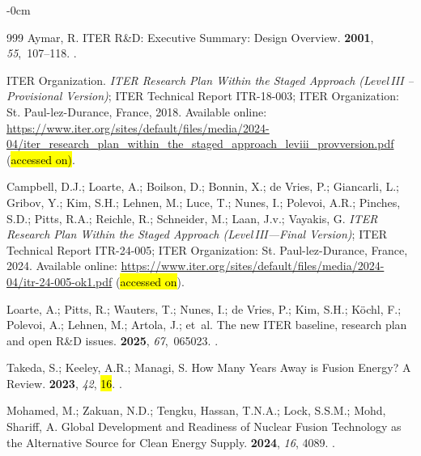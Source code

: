 \documentclass[particles,article,accept,pdftex,moreauthors]{Definitions/mdpi}
\begin{document}
\begin{adjustwidth}{-\extralength}{0cm}
\begin{thebibliography}{999}
Aymar, R.
\newblock ITER R\&D: Executive Summary: Design Overview.
 {\bf 2001}, {\em 55},~107--118.
.

{ITER Organization}.
\newblock \emph{ITER Research Plan Within the Staged Approach (Level\,III –
  Provisional Version)};
\newblock ITER Technical Report ITR-18-003; ITER Organization: St. Paul-lez-Durance, France,  2018.
\newblock
  Available online:  \url{https://www.iter.org/sites/default/files/media/2024-04/iter_research_plan_within_the_staged_approach_leviii_provversion.pdf} (\hl{accessed on)}.

Campbell, D.J.; Loarte, A.;  Boilson, D.; Bonnin, X.; de Vries, P.; Giancarli, L.; Gribov, Y.; Kim, S.H.; Lehnen, M.; Luce, T.; Nunes, I.; Polevoi, A.R.; Pinches, S.D.; Pitts, R.A.; Reichle, R.; Schneider, M.; Laan, J.v.; Vayakis, G.
\newblock \emph{ITER Research Plan Within the Staged Approach (Level\,III---Final
  Version)};
\newblock ITER Technical Report ITR-24-005; {ITER Organization}: St. Paul-lez-Durance, France,  2024.
\newblock
Available online:  \url{https://www.iter.org/sites/default/files/media/2024-04/itr-24-005-ok1.pdf} (\hl{accessed on}).

Loarte, A.; Pitts, R.;  Wauters, T.; Nunes, I.; de Vries, P.; Kim, S.H.; Köchl, F.; Polevoi, A.; Lehnen, M.; Artola, J.; et~al.
\newblock The new ITER baseline, research plan and open R\&D issues.
 {\bf 2025}, {\em 67},~065023.
.

Takeda, S.; Keeley, A.R.;  Managi, S.
\newblock How Many Years Away is Fusion Energy? A Review.
 {\bf 2023}, {\em 42}, \hl{16}.
.

Mohamed, M.; Zakuan, N.D.;  Tengku, Hassan, T.N.A.; Lock, S.S.M.; Mohd, Shariff, A.
\newblock Global Development and Readiness of Nuclear Fusion Technology as the
  Alternative Source for Clean Energy Supply.
 {\bf 2024}, {\em 16}, 4089.
.


\end{thebibliography}
\end{adjustwidth}
\end{document}
